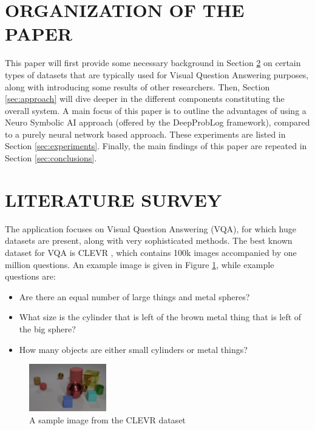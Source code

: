 \documentclass[english]{sobraep}
\begin{document}
\section{ORGANIZATION OF THE PAPER}
This paper will first provide some necessary background in Section \ref{sec:literature_survey} on certain types of datasets that are typically used for Visual Question Answering purposes, along with introducing some results of other researchers. Then, Section \ref{sec:approach} will dive deeper in the different components constituting the overall system. A main focus of this paper is to outline the advantages of using a Neuro Symbolic AI approach (offered by the DeepProbLog framework), compared to a purely neural network based approach. These experiments are listed in Section \ref{sec:experiments}. Finally, the main findings of this paper are repeated in Section \ref{sec:conclusions}.

\section{LITERATURE SURVEY}
\label{sec:literature_survey}
The application focuses on Visual Question Answering (VQA), for which huge datasets are present, along with very sophisticated methods. The best known dataset for VQA is CLEVR \cite{clevr_dataset}, which contains 100k images accompanied by one million questions. An example image is given in Figure \ref{fig:sample_image_clevr}, while example questions are:
\begin{itemize}
    \item Are there an equal number of large things and metal spheres?
    \item What size is the cylinder that is left of the brown metal thing that is left of the big sphere?
    \item How many objects are either small cylinders or metal things?
\end{itemize}

\begin{figure}[htp]
    \begin{center}
    \includegraphics[width=0.3\textwidth]{clevr.jpg}
    \captionsetup{justification=centering}
    \caption{A sample image from the CLEVR dataset \cite{clevr_dataset}}
    \label{fig:sample_image_clevr}
    \end{center}
\end{figure}
\end{document}
